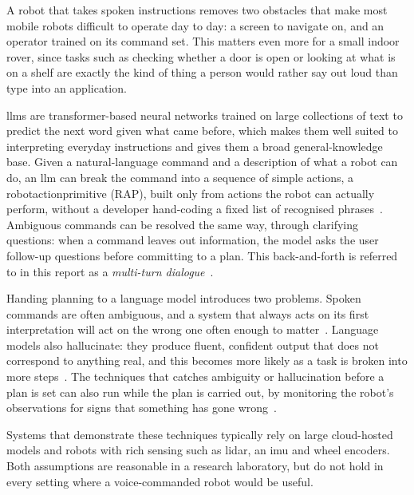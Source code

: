 \label{chap:introduction}

\label{sec:background}

A robot that takes spoken instructions removes two obstacles that make most mobile robots
difficult to operate day to day: a screen to navigate on, and an operator trained on its
command set. This matters even more for a small indoor rover, since tasks such as checking
whether a door is open or looking at what is on a shelf are exactly the kind of thing a person
would rather say out loud than type into an application.

\Acp{llm} are transformer-based neural networks trained on large collections of text to predict
the next word given what came before, which makes them well suited to interpreting everyday
instructions and gives them a broad general-knowledge base. Given a natural-language command
and a description of what a robot can do, an \ac{llm} can break the command into a sequence of
simple actions, a \ac{robotactionprimitive} (RAP), built only from actions the robot can
actually perform, without a developer hand-coding a fixed list of recognised
phrases~\cite{ahn2022saycan}. Ambiguous commands can be resolved the same way, through
clarifying questions: when a command leaves out information, the model asks the user
follow-up questions before committing to a plan. This back-and-forth is referred to in this
report as a \emph{multi-turn dialogue}~\cite{hori2025longhorizon}.

Handing planning to a language model introduces two problems. Spoken commands are often
ambiguous, and a system that always acts on its first interpretation will act on the wrong one
often enough to matter~\cite{ren2023knowno}. Language models also hallucinate: they produce
fluent, confident output that does not correspond to anything real, and this becomes more
likely as a task is broken into more steps~\cite{liang2024introspective}. The techniques that
catches ambiguity or hallucination before a plan is set can also run while the plan is carried
out, by monitoring the robot's observations for signs that something has gone
wrong~\cite{sinha2024aesop, elhafsi2023semantic}.

Systems that demonstrate these techniques typically rely on large cloud-hosted models and
robots with rich sensing such as \acs{lidar}, an \ac{imu} and wheel encoders. Both assumptions
are reasonable in a research laboratory, but do not hold in every setting where a
voice-commanded robot would be useful.

